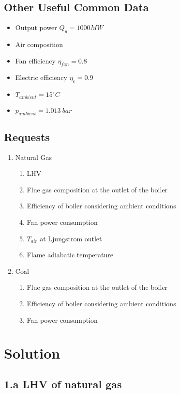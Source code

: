 \documentclass[a4paper,12pt]{article}
\begin{document}
\subsection*{Other Useful Common Data}
\begin{itemize}
\item Output power $\dot{Q}_u = 1000MW$
\item Air composition
\item Fan efficiency $ \eta_{fan}=0.8 $
\item Electric efficiency $ \eta_{e}=0.9 $
\item $ T_{ambient} = 15 ^\circ C $
\item $ p_{ambient} = 1.013\ bar $
\end{itemize}

\subsection*{Requests}
\begin{enumerate}
\item Natural Gas
\begin{enumerate}
\item LHV
\item Flue gas composition at the outlet of the boiler
\item Efficiency of boiler considering ambient conditions
\item Fan power consumption
\item $T_{air}$ at Ljungstrom outlet
\item Flame adiabatic temperature
\end{enumerate}

\item Coal
\begin{enumerate}
\item Flue gas composition at the outlet of the boiler
\item Efficiency of boiler considering ambient conditions
\item Fan power consumption
\end{enumerate}
\end{enumerate}

\section{Solution}

\subsection*{1.a LHV of natural gas} 
\end{document}
